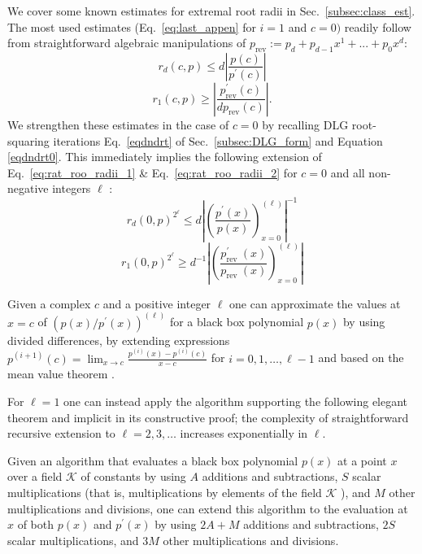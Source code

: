 \documentclass[runningheads]{llncs}
\begin{document}
We cover some known estimates for extremal root radii in Sec.~\ref{subsec:class_est}. The most used estimates (Eq.~\ref{eq:last_appen} for $i=1$ and $c=0)$ readily follow from straightforward algebraic manipulations of $p_\text{rev}:=p_d+p_{d-1}x^1+...+p_0x^d$:
\begin{equation}\label{eq:rat_roo_radii_1}
r_{d}(c, p) \leq d\left|\frac{p(c)}{p^{\prime}(c)}\right|
\end{equation}
\begin{equation}\label{eq:rat_roo_radii_2}
 r_{1}(c, p) \geq\left|\frac{p_{\mathrm{rev}}^{\prime}(c)}{d p_{\mathrm{rev}}(c)}\right| .
\end{equation}
We strengthen these estimates in the case of $c=0$ by recalling DLG root-squaring iterations Eq.~\ref{eqdndrt} of Sec.~\ref{subsec:DLG_form} and Equation \ref{eqdndrt0}. This immediately implies the following extension of Eq.~\ref{eq:rat_roo_radii_1} \& Eq.~\ref{eq:rat_roo_radii_2} for $c=0$ and all non-negative integers $\ell$ :
\begin{equation}\label{eq:rat_roo_radii_3}
r_{d}(0, p)^{2^{\ell}} \leq d \left|\left(\frac{p^{\prime}(x)}{p(x)}\right)_{x=0}^{(\ell)}\right|^{-1}
\end{equation}
\begin{equation}\label{eq:rat_roo_radii_4}
r_{1}(0, p)^{2^{\ell}} \geq d^{-1}\left|\left(\frac{ p^{\prime}_{\text {rev }}(x)}{p_{\text {rev }}(x)}\right)_{x=0}^{(\ell)}\right|
\end{equation}
\begin{remark}\label{rem:fin_diff}
 Given a complex $c$ and a positive integer $\ell$ one can approximate the values at $x=c$ of $\left(p(x) / p^{\prime}(x)\right)^{(\ell)}$ for a black box polynomial $p(x)$ by using divided differences, by extending expressions $p^{(i+1)}(c)=\lim _{x \rightarrow c} \frac{p^{(i)}(x)-p^{(i)}(c)}{x-c}$ for $i=0,1, \ldots, \ell-1$ and based on the mean value theorem \cite{Boor1995DividedD}.
\end{remark}

For $\ell=1$ one can instead apply the algorithm supporting the following elegant theorem and implicit in its constructive proof; the complexity of straightforward recursive extension to $\ell=2,3, \ldots$ increases exponentially in $\ell$.

\begin{theorem}
Given an algorithm that evaluates a black box polynomial $p(x)$ at a point $x$ over a field $\mathcal{K}$ of constants by using $A$ additions and subtractions, $S$ scalar multiplications (that is, multiplications by elements of the field $\mathcal{K}$ ), and $M$ other multiplications and divisions, one can extend this algorithm to the evaluation at $x$ of both $p(x)$ and $p^{\prime}(x)$ by using $2 A+M$ additions and subtractions, $2 S$ scalar multiplications, and $3 M$ other multiplications and divisions.
\end{theorem}
\end{document}
